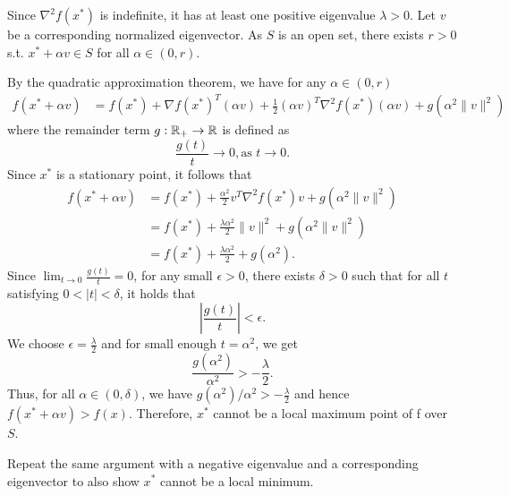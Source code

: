 \documentclass{ExerciseSheet}
\begin{document}
\begin{solution}
Since $\nabla^2f(x^*)$ is indefinite, it has at least one positive eigenvalue $\lambda >0$. Let $v$ be a corresponding normalized eigenvector. As $S$ is an open set, there exists $r>0$ s.t. $x^*+\alpha v \in S$ for all $\alpha \in (0, r)$. 

By the quadratic approximation theorem, we have for any $\alpha \in (0,r)$ 
\begin{align*}
    f(x^*+\alpha v) &= f(x^*) + \nabla f(x^*)^T(\alpha v)+\frac{1}{2}(\alpha v)^T \nabla^2f(x^*)(\alpha v) + g(\alpha^2 \|v\|^2)
\end{align*}
where the remainder term $g: \mathbb{R}_+ \rightarrow \mathbb{R}$ is defined as 
\begin{equation}\label{eq: gt}
    \frac{g(t)}{t} \rightarrow 0, \text{as } t\rightarrow 0. 
\end{equation}
Since $x^*$ is a stationary point, it follows that
\begin{align*}
    f(x^*+\alpha v) &= f(x^*) + \frac{\alpha^2}{2}v^T \nabla^2f(x^*)v + g(\alpha^2 \|v\|^2) \\
    &=f(x^*) + \frac{\lambda \alpha^2}{2} \|v\|^2 + g(\alpha^2\|v\|^2) \\
    &= f(x^*) + \frac{\lambda \alpha^2}{2} + g(\alpha^2).
\end{align*}
Since $\lim_{t\rightarrow0}\frac{g(t)}{t} = 0$, for any small $\epsilon>0$, there exists $\delta>0$ such that for all $t$ satisfying $0<|t|<\delta$, it holds that 
\begin{equation*}
    \left\lvert \frac{g(t)}{t}\right\rvert<\epsilon.
\end{equation*}
We choose $\epsilon = \frac{\lambda}{2}$ and for small enough $t = \alpha^2$, we get
\begin{equation*}
    \frac{g(\alpha^2)}{\alpha^2}>-\frac{\lambda}{2}.
\end{equation*}
Thus, for all $\alpha \in (0, \delta)$, we have $g(\alpha^2)/\alpha^2>-\frac{\lambda}{2}$ and hence $f(x^*+\alpha v) > f(x)$. Therefore, $x^*$ cannot be a local maximum point of f over $S$.

Repeat the same argument with a negative eigenvalue and a corresponding eigenvector to also show $x^*$ cannot be a local minimum. 
\end{solution}

\fi
\end{document}
